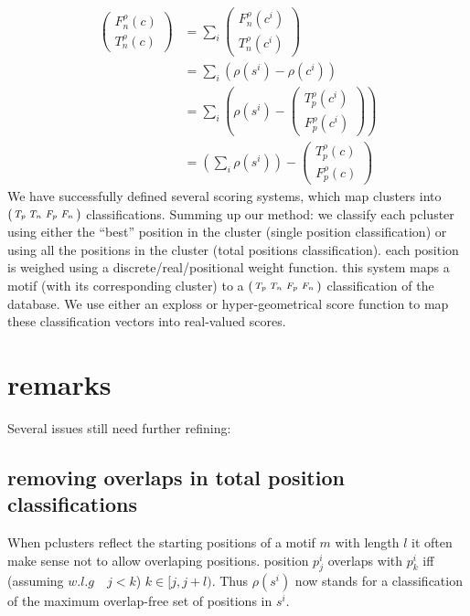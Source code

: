 \documentclass{amsart}
\theoremstyle{definition}
\theoremstyle{remark}
\theoremstyle{definition}
\theoremstyle{remark}
\begin{document}
\begin{align*}
		\begin{pmatrix} 
			F_n^{\rho}(c) \\ 
			T_n^{\rho}(c) 
		\end{pmatrix}  
		& =	\sum_i \begin{pmatrix} 
					F_n^{\rho}(c^i) \\ 
					T_n^{\rho}(c^i) 
				\end{pmatrix} \\
		& = \sum_i 	\left( \rho(s^i) - 	\rho(c^i) \right) \\
		& = \sum_i	\left( \rho(s^i) -	\begin{pmatrix} 
														T_p^{\rho}(c^i) \\ 
														F_p^{\rho}(c^i) 
													\end{pmatrix} 
						\right) \\
		& = \left(	\sum_i  \rho(s^i) \right) -	\begin{pmatrix} 
																	T_p^{\rho}(c) \\ 
																	F_p^{\rho}(c) 
																\end{pmatrix}
\end{align*}
We have successfully defined several scoring systems, which map clusters into $\left(\begin{smallmatrix} T_p & T_n & F_p & F_n \end{smallmatrix}\right)$ classifications.
Summing up our method: we classify each pcluster using either the ``best'' position in the cluster (single position classification) 
or using all the positions in the cluster (total positions classification).
each position is weighed using a discrete/real/positional weight function.
this system maps a motif (with its corresponding cluster) to a $\left(\begin{smallmatrix} T_p & T_n & F_p & F_n \end{smallmatrix}\right)$ classification of the database.
We use either an exploss or hyper-geometrical score function to map these classification vectors
into real-valued scores.

\section{remarks}
Several issues still need further refining:

\subsection{removing overlaps in total position classifications}
When pclusters reflect the starting positions of a motif $m$ with length $l$
it often make sense not to allow overlaping positions.
position $p^i_j$ overlaps with $p^i_k$ iff (assuming $w.l.g \quad j<k$) $k \in [j, j + l)$.
Thus $\rho(s^i)$ now stands for a classification of the maximum overlap-free set of positions in $s^i$.
\end{document}
